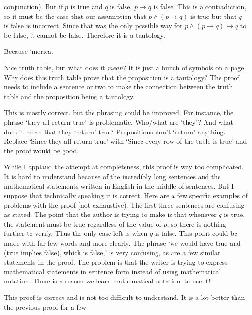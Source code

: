 \begin{eval}
\begin{spfenum}
conjunction).  But if $p$ is true and $q$ is false, $p\rightarrow q$ is false. 
This is a contradiction, so it must be the case that our assumption that 
$p\wedge(p\rightarrow q)$ is true but that $q$ is false is incorrect.
Since that was the only possible way for $p\wedge(p\rightarrow q)\rightarrow q$ to be false, it cannot be false.
Therefore it is a tautology.\\
\evallinethree
\item
Because `merica.\\
\evallinetwo
\end{spfenum}
\begin{answer}
\begin{pfevalenum}
\item
Nice truth table, but what does it {\em mean}?  It is just a bunch of symbols on a page.
Why does this truth table prove that the proposition is a tautology?
The proof needs to include a sentence or two to make the connection between the truth table and
the proposition being a tautology.
\item
 This is mostly correct, but the phrasing could be improved.  For instance, the phrase
`they all return true' is problematic.  Who/what are `they'?  And what does it mean that they
`return' true?   Propositions don't `return' anything.
Replace `Since they all return true' with `Since every row of the table is true' and the proof would be good.
\item
While I applaud the attempt at completeness, this proof is way too complicated.  It is hard to
understand because of the incredibly long sentences and the mathematical statements written in English
in the middle of sentences.  But I suppose that technically speaking it is correct.
Here are a few specific examples of problems with the proof (not exhaustive).  
The first three sentences are confusing as stated.  The point that the 
author is trying to make is that whenever $q$ is true, the statement must be true regardless of the value of $p$, 
so there is nothing further to verify.  Thus the only case left is when $q$ is false.  This point could be made
with far few words and more clearly.
The phrase `we would have true and (true implies false), which is false,' is very confusing, as are a few similar
statements in the proof.  The problem is that the writer is trying to express mathematical statements in 
sentence form instead of using mathematical notation.  
There is a reason we learn mathematical notation--to use it!  
\item
This proof is correct and is not too difficult to understand.  It is a lot better than the previous proof for a few

\end{pfevalenum}
\end{answer}
\end{eval}
